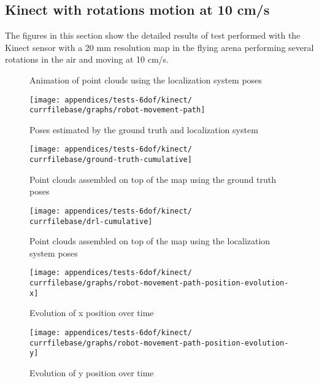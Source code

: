 \subsection{Kinect with rotations motion at 10 cm/s}

The figures in this section show the detailed results of test performed with the Kinect sensor with a 20 mm resolution map in the flying arena performing several rotations in the air and moving at 10 cm/s.


\begin{figure}[H]
	\centering
	\caption{Animation of point clouds using the localization system poses}
	\label{fig:localization-system-evaluation_kinect_rotations}
\end{figure}

\begin{figure}[H]
	\centering
	\texttt{[image: appendices/tests-6dof/kinect/\\currfilebase/graphs/robot-movement-path]}
	\caption{Poses estimated by the ground truth and localization system}
\end{figure}


\begin{figure}[H]
	\centering
	\texttt{[image: appendices/tests-6dof/kinect/\\currfilebase/ground-truth-cumulative]}
	\caption{Point clouds assembled on top of the map using the ground truth poses}
\end{figure}

\begin{figure}[H]
	\centering
	\texttt{[image: appendices/tests-6dof/kinect/\\currfilebase/drl-cumulative]}
	\caption{Point clouds assembled on top of the map using the localization system poses}
\end{figure}


\begin{figure}[H]
	\centering
	\texttt{[image: appendices/tests-6dof/kinect/\\currfilebase/graphs/robot-movement-path-position-evolution-x]}
	\caption{Evolution of x position over time}
\end{figure}

\begin{figure}[H]
	\centering
	\texttt{[image: appendices/tests-6dof/kinect/\\currfilebase/graphs/robot-movement-path-position-evolution-y]}
	\caption{Evolution of y position over time}
\end{figure}

